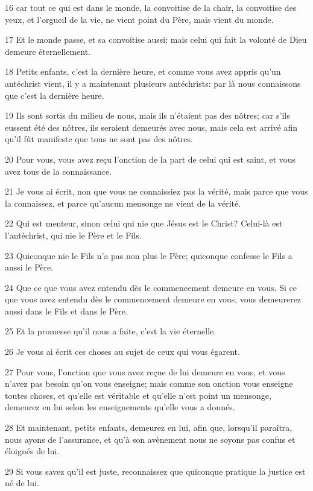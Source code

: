 \par 16 car tout ce qui est dans le monde, la convoitise de la chair, la convoitise des yeux, et l'orgueil de la vie, ne vient point du Père, mais vient du monde.
\par 17 Et le monde passe, et sa convoitise aussi; mais celui qui fait la volonté de Dieu demeure éternellement.
\par 18 Petits enfants, c'est la dernière heure, et comme vous avez appris qu'un antéchrist vient, il y a maintenant plusieurs antéchrists: par là nous connaissons que c'est la dernière heure.
\par 19 Ils sont sortis du milieu de nous, mais ils n'étaient pas des nôtres; car s'ils eussent été des nôtres, ils seraient demeurés avec nous, mais cela est arrivé afin qu'il fût manifeste que tous ne sont pas des nôtres.
\par 20 Pour vous, vous avez reçu l'onction de la part de celui qui est saint, et vous avez tous de la connaissance.
\par 21 Je vous ai écrit, non que vous ne connaissiez pas la vérité, mais parce que vous la connaissez, et parce qu'aucun mensonge ne vient de la vérité.
\par 22 Qui est menteur, sinon celui qui nie que Jésus est le Christ? Celui-là est l'antéchrist, qui nie le Père et le Fils.
\par 23 Quiconque nie le Fils n'a pas non plus le Père; quiconque confesse le Fils a aussi le Père.
\par 24 Que ce que vous avez entendu dès le commencement demeure en vous. Si ce que vous avez entendu dès le commencement demeure en vous, vous demeurerez aussi dans le Fils et dans le Père.
\par 25 Et la promesse qu'il nous a faite, c'est la vie éternelle.
\par 26 Je vous ai écrit ces choses au sujet de ceux qui vous égarent.
\par 27 Pour vous, l'onction que vous avez reçue de lui demeure en vous, et vous n'avez pas besoin qu'on vous enseigne; mais comme son onction vous enseigne toutes choses, et qu'elle est véritable et qu'elle n'est point un mensonge, demeurez en lui selon les enseignements qu'elle vous a donnés.
\par 28 Et maintenant, petits enfants, demeurez en lui, afin que, lorsqu'il paraîtra, nous ayons de l'assurance, et qu'à son avènement nous ne soyons pas confus et éloignés de lui.
\par 29 Si vous savez qu'il est juste, reconnaissez que quiconque pratique la justice est né de lui.


